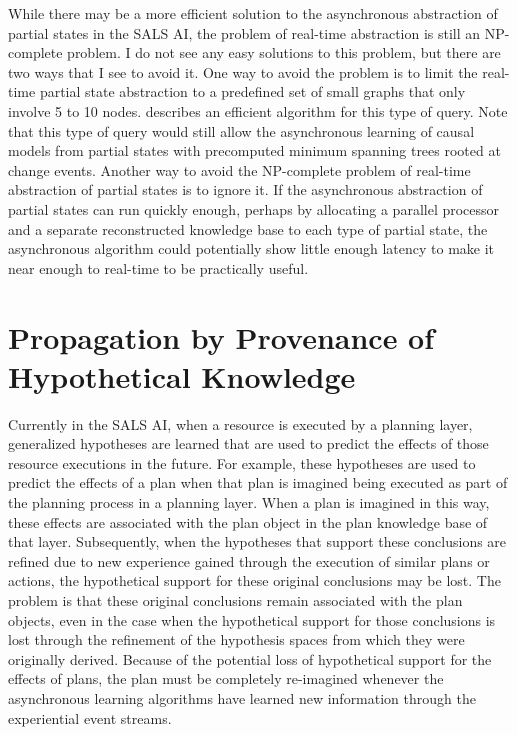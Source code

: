 While there may be a more efficient solution to the asynchronous
abstraction of partial states in the SALS AI, the problem of real-time
abstraction is still an NP-complete problem.  I do not see any easy
solutions to this problem, but there are two ways that I see to avoid
it.  One way to avoid the problem is to limit the real-time partial
state abstraction to a predefined set of small graphs that only
involve 5 to 10 nodes.  \cite{messmer:1995} describes an efficient
algorithm for this type of query.  Note that this type of query would
still allow the asynchronous learning of causal models from partial
states with precomputed minimum spanning trees rooted at change
events.  Another way to avoid the NP-complete problem of real-time
abstraction of partial states is to ignore it.  If the asynchronous
abstraction of partial states can run quickly enough, perhaps by
allocating a parallel processor and a separate reconstructed knowledge
base to each type of partial state, the asynchronous algorithm could
potentially show little enough latency to make it near enough to
real-time to be practically useful.

\section{Propagation by Provenance of Hypothetical Knowledge}

Currently in the SALS AI, when a resource is executed by a planning
layer, generalized hypotheses are learned that are used to predict the
effects of those resource executions in the future.  For example,
these hypotheses are used to predict the effects of a plan when that
plan is imagined being executed as part of the planning process in a
planning layer.  When a plan is imagined in this way, these effects
are associated with the plan object in the plan knowledge base of that
layer.  Subsequently, when the hypotheses that support these
conclusions are refined due to new experience gained through the
execution of similar plans or actions, the hypothetical support for
these original conclusions may be lost.  The problem is that these
original conclusions remain associated with the plan objects, even in
the case when the hypothetical support for those conclusions is lost
through the refinement of the hypothesis spaces from which they were
originally derived.  Because of the potential loss of hypothetical
support for the effects of plans, the plan must be completely
re-imagined whenever the asynchronous learning algorithms have learned
new information through the experiential event streams.

